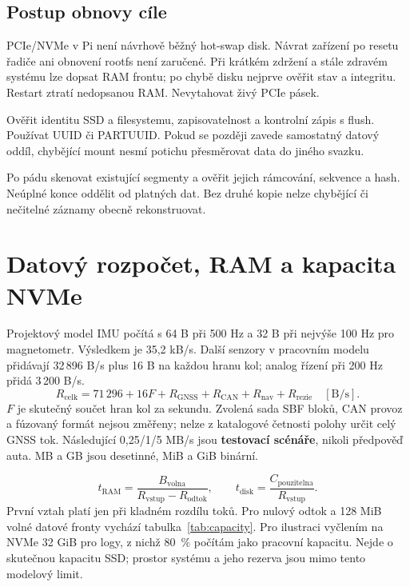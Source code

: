 \documentclass[11pt,a4paper]{article}
\newcommand{\novastrana}{\clearpage}
\begin{document}
\subsection{Postup obnovy cíle}
PCIe/NVMe v Pi není návrhově běžný hot-swap disk. Návrat zařízení po resetu řadiče ani obnovení rootfs není zaručené. Při krátkém zdržení a stále zdravém systému lze dopsat RAM frontu; po chybě disku nejprve ověřit stav a integritu. Restart ztratí nedopsanou RAM. Nevytahovat živý PCIe pásek.

Ověřit identitu SSD a filesystemu, zapisovatelnost a kontrolní zápis s flush. Používat UUID či PARTUUID. Pokud se později zavede samostatný datový oddíl, chybějící mount nesmí potichu přesměrovat data do jiného svazku.

Po pádu skenovat existující segmenty a ověřit jejich rámcování, sekvence a hash. Neúplné konce oddělit od platných dat. Bez druhé kopie nelze chybějící či nečitelné záznamy obecně rekonstruovat.

\novastrana
\section{Datový rozpočet, RAM a kapacita NVMe}
Projektový model IMU počítá s 64 B při 500 Hz a 32 B při nejvýše 100 Hz pro magnetometr. Výsledkem je 35,2 kB/s. Další senzory v pracovním modelu přidávají 32\,896 B/s plus 16 B na každou hranu kol; analog řízení při 200 Hz přidá 3\,200 B/s.\cite{projekt}
\begin{equation}
R_{\mathrm{celk}}=71\,296+16F+R_{\mathrm{GNSS}}+R_{\mathrm{CAN}}+R_{\mathrm{nav}}+R_{\mathrm{rezie}}\quad[\mathrm{B/s}].
\end{equation}
$F$ je skutečný součet hran kol za sekundu. Zvolená sada SBF bloků, CAN provoz a fúzovaný formát nejsou změřeny; nelze z katalogové četnosti polohy určit celý GNSS tok. Následující 0,25/1/5 MB/s jsou \textbf{testovací scénáře}, nikoli předpověď auta. MB a GB jsou desetinné, MiB a GiB binární.

\begin{equation}
t_{\mathrm{RAM}}=\frac{B_{\mathrm{volna}}}{R_{\mathrm{vstup}}-R_{\mathrm{odtok}}},\qquad
t_{\mathrm{disk}}=\frac{C_{\mathrm{pouzitelna}}}{R_{\mathrm{vstup}}}.
\end{equation}
První vztah platí jen při kladném rozdílu toků. Pro nulový odtok a 128 MiB volné datové fronty vychází tabulka~\ref{tab:capacity}. Pro ilustraci vyčlením na NVMe 32 GiB pro logy, z nichž 80~\% počítám jako pracovní kapacitu. Nejde o skutečnou kapacitu SSD; prostor systému a jeho rezerva jsou mimo tento modelový limit.
\end{document}

